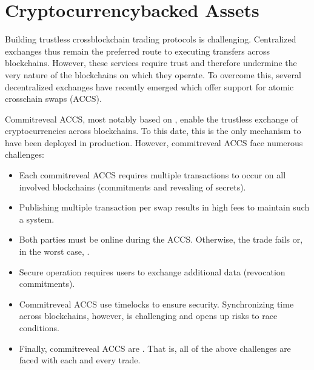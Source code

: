 \documentclass[a4paper,10pt,english]{sphinxmanual}
\begin{document}
\chapter{Cryptocurrency\sphinxhyphen{}backed Assets}
\label{\detokenize{intro/CbA:cryptocurrency-backed-assets}}\label{\detokenize{intro/CbA::doc}}
Building trustless cross\sphinxhyphen{}blockchain trading protocols is challenging.
Centralized exchanges thus remain the preferred route to executing transfers across blockchains.
However, these services require trust and therefore undermine the very nature of the blockchains on which they operate.
To overcome this, several decentralized exchanges have recently emerged which offer support for  atomic cross\sphinxhyphen{}chain swaps (ACCS).

Commit\sphinxhyphen{}reveal ACCS, most notably based on , enable the trustless exchange of cryptocurrencies across blockchains.
To this date, this is the only mechanism to have been deployed in production.
However, commit\sphinxhyphen{}reveal ACCS face numerous challenges:
\begin{itemize}
\item {} 
 Each commit\sphinxhyphen{}reveal ACCS requires multiple transactions to occur on all
involved blockchains (commitments and revealing of secrets).

\item {} 
 Publishing multiple transaction per swap results in high fees to maintain such a system.

\item {} 
 Both parties must be online during the ACCS. Otherwise, the trade fails or, in the worst case, .

\item {} 
 Secure operation requires users to exchange additional data  (revocation commitments).

\item {} 
 Commit\sphinxhyphen{}reveal ACCS use time\sphinxhyphen{}locks to ensure security. Synchronizing time across
blockchains, however, is challenging and opens up risks to race conditions.

\item {} 
 Finally, commit\sphinxhyphen{}reveal ACCS are . That is, all of the above challenges are faced with each and every trade.

\end{itemize}
\end{document}

